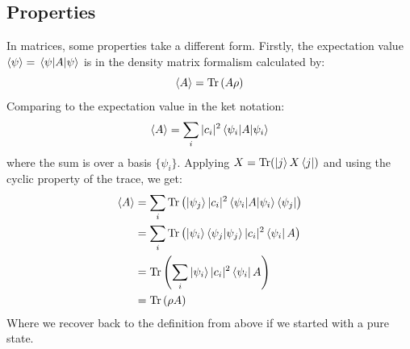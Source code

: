 \subsection{Properties}
In matrices, some properties take a different form. Firstly, the expectation value $\expval{\psi} = \mel{\psi}{A}{\psi}$ is in the density matrix formalism calculated by:
\begin{equation}
    \expval{A} = \Tr \left(A\rho\right)
\end{equation}
Comparing to the expectation value in the ket notation:
\begin{equation}
    \expval{A}= \sum_i |c_i|^2 \mel{\psi_i}{A}{\psi_i}
\end{equation}
where the sum is over a basis $\{\psi_i\}$. Applying $X = \Tr(\ket{j}X\bra{j})$ and using the cyclic property of the trace, we get:
\begin{align}
    \expval{A}  &= \sum_i \Tr\left(\ket{\psi_j}|c_i|^2 \mel{\psi_i}{A}{\psi_i}\bra{\psi_j}\right) \\
                &= \sum_i \Tr\left(\ket{\psi_i}\bra{\psi_j}\ket{\psi_j}|c_i|^2 \bra{\psi_i}{A}\right) \\
                &=  \Tr\left( \sum_i \ket{\psi_i}|c_i|^2 \bra{\psi_i}{A}\right) \\
                &= \Tr\left(\rho A\right)
\end{align}
Where we recover back to the definition from above if we started with a pure state. 


